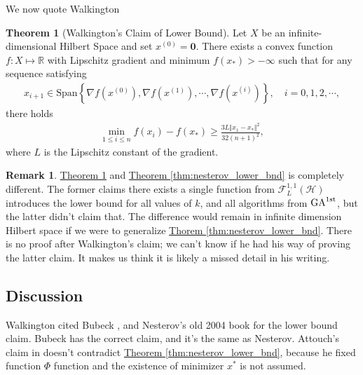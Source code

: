 \documentclass[]{article}
\theoremstyle{definition}
\newtheorem{theorem}{Theorem}[subsection]       %
\newtheorem{remark}{Remark}[subsection]
{
    \newtheorem{assumption}{Assumption}
}
\numberwithin{equation}{subsection}
\begin{document}
        We now quote Walkington \cite[theorem 2.4]{noel_nesterovs_nodate}
        \begin{theorem}[Walkington's Claim of Lower Bound]\label{thm:walkington_lowerbound}
            Let $X$ be an infinite-dimensional Hilbert Space and set $x^{(0)} =\mathbf 0$. There exists a convex function $f: X\mapsto \mathbb R$ with Lipschitz gradient and minimum $f(x_*) > -\infty$ such that for any sequence satisfying 
            \begin{align*}
                x_{i + 1}\in \text{Span}\left\lbrace
                    \nabla f(x^{(0)}), \nabla f(x^{(1)}), \cdots, \nabla f(x^{(i)})
                \right\rbrace, 
                \quad i = 0, 1, 2, \cdots, 
            \end{align*}
            there holds 
            \begin{align*}
                \min_{1\le i \le n}
                f(x_i) - f(x_*) \ge 
                \frac{3L\Vert x_1 - x_*\Vert^2}{32(n + 1)^2}, 
            \end{align*}
            where $L$ is the Lipschitz constant of the gradient. 
        \end{theorem}
        \begin{remark}
            \hyperref[thm:walkington_lowerbound]{Theorem \ref*{thm:walkington_lowerbound}} and 
            \hyperref[thm:nesterov_lower_bnd]{Theorem \ref*{thm:nesterov_lower_bnd}} is completely different. 
            The former claims there exists a single function from $\mathcal F_{L}^{1,1}(\mathcal H)$ introduces the lower bound for all values of $k$, and all algorithms from $\text{GA}^{\text{1st}}$, but the latter didn't claim that. 
            The difference would remain in infinite dimension Hilbert space if we were to generalize \hyperref[thm:nesterov_lower_bnd]{Thorem \ref*{thm:nesterov_lower_bnd}}. 
            There is no proof after Walkington's claim; we can't know if he had his way of proving the latter claim. 
            It makes us think it is likely a missed detail in his writing. 
        \end{remark}
    \subsection{Discussion}
        Walkington cited Bubeck \cite[thm 3.14]{bubeck_convex_2015}, and Nesterov's old 2004 book\cite{nesterov_introductory_2004} for the lower bound claim. 
        Bubeck has the correct claim, and it's the same as Nesterov. 
        Attouch's claim in \cite[thm 1]{attouch_rate_2016} doesn't contradict \hyperref[thm:nesterov_lower_bnd]{Theorem \ref*{thm:nesterov_lower_bnd}}, because he fixed function $\Phi$ function and the existence of minimizer $x^*$ is not assumed. 
        
\end{document}

